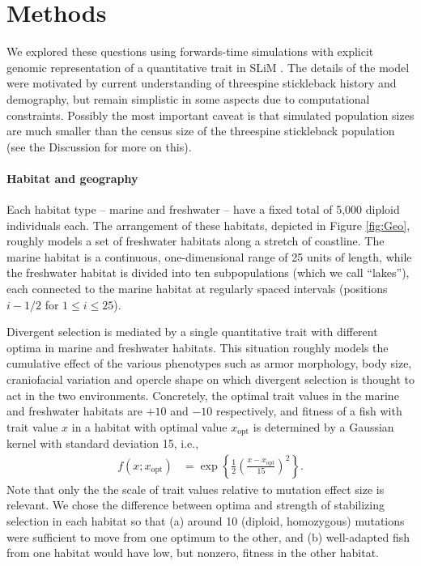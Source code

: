 \documentclass{article}
\begin{document}
\section*{Methods}

We explored these questions using forwards-time simulations with explicit genomic representation of a quantitative trait in SLiM \citep{haller2017slim,haller2018slim3}.
The details of the model were motivated by current understanding of threespine stickleback history and demography,
but remain simplistic in some aspects due to computational constraints.
Possibly the most important caveat
is that simulated population sizes are much smaller than the census size of the threespine stickleback population
(see the Discussion for more on this).

\paragraph{Habitat and geography}
Each habitat type -- marine and freshwater -- have a fixed total of 5,000 diploid individuals each. 
The arrangement of these habitats, depicted in Figure \ref{fig:Geo},
roughly models a set of freshwater habitats along a stretch of coastline. 
The marine habitat  is a continuous, one-dimensional range of 25 units of length,
while the freshwater habitat is divided into ten subpopulations (which we call ``lakes''),
each connected to the marine habitat at regularly spaced intervals
(positions $i - 1/2$ for $1 \le i \le 25$).

Divergent selection is mediated by a single quantitative trait
with different optima in marine and freshwater habitats.
This situation roughly models the cumulative effect of the various phenotypes such as armor morphology, 
body size, craniofacial variation and opercle shape on which divergent selection is thought to act
in the two environments. 
Concretely, the optimal trait values in the marine and freshwater habitats are $+10$ and $-10$ respectively,
and fitness of a fish with trait value $x$ in a habitat with optimal value $x_\text{opt}$
is determined by a Gaussian kernel with standard deviation 15, i.e.,
\begin{align*}
    f(x; x_\text{opt})
    &=
    \exp\left\{
        \frac{1}{2}
            \left(
            \frac{x-x_\text{opt}}{15}
            \right)^2
        \right\} .
\end{align*}
Note that only the the scale of trait values relative to mutation effect size is relevant.
We chose the difference between optima and strength of stabilizing selection in each habitat
so that 
(a) around 10 (diploid, homozygous) mutations were sufficient to move from one optimum to the other,
and (b) well-adapted fish from one habitat would have low, but nonzero, fitness in the other habitat.
\end{document}
